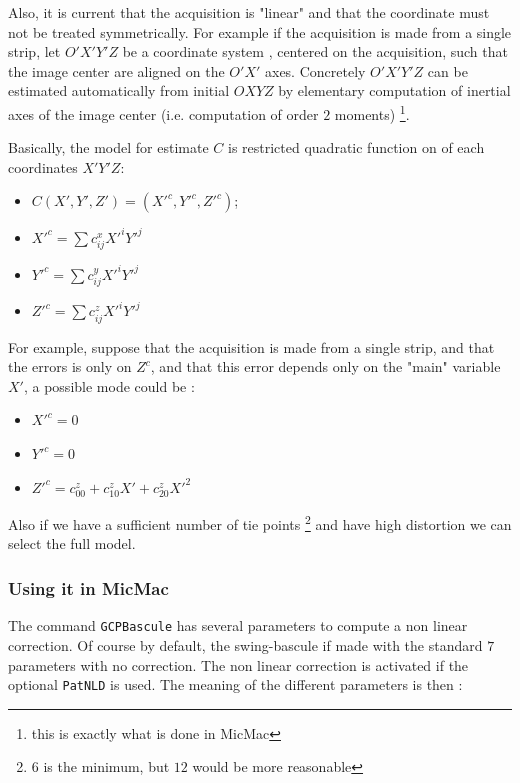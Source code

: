 Also, it is current that the acquisition is "linear" and that the coordinate must not be treated
symmetrically. For example if the acquisition is made from a single strip, let $O'X'Y'Z$ be a
coordinate system ,  centered on the acquisition, such that the image center are aligned on the $O'X'$ axes.
Concretely $O'X'Y'Z$ can be estimated automatically from initial $OXYZ$ by elementary computation of inertial axes of the
image center (i.e. computation of order $2$ moments) \footnote{this is exactly what is done in MicMac}.



Basically, the model for estimate $C$ is restricted  quadratic function on of  each coordinates $X'Y'Z$:

\begin{itemize}
   \item $C(X',Y',Z') = (X'^c,Y'^c,Z'^c)$;
   \item $X'^c = \sum c^x_{ij} X'^i Y'^j$
   \item $Y'^c = \sum c^y_{ij} X'^i Y'^j$
   \item $Z'^c = \sum c^z_{ij} X'^i Y'^j$
\end{itemize}


For example, suppose that the acquisition is made from a single strip, and
that the errors is only on $Z^c$,  and that this error depends only on  the
"main" variable $X'$, a possible mode could be :

\begin{itemize}
   \item $X'^c = 0$
   \item $Y'^c = 0$
   \item $Z'^c =  c^z_{00} + c^z_{10} X' + c^z_{20} X'^2$
\end{itemize}

Also if we have a sufficient number of tie points \footnote{$6$ is the minimum, but $12$ would be more
reasonable} and have high distortion we can select the full model.


\subsubsection{Using it in MicMac}

The command {\tt GCPBascule} has several parameters to compute a non linear
correction. Of course by default, the swing-bascule if made with the standard $7$ parameters
with no correction. The non linear correction is activated if the optional {\tt PatNLD} is
used. The meaning of the different parameters is then :


